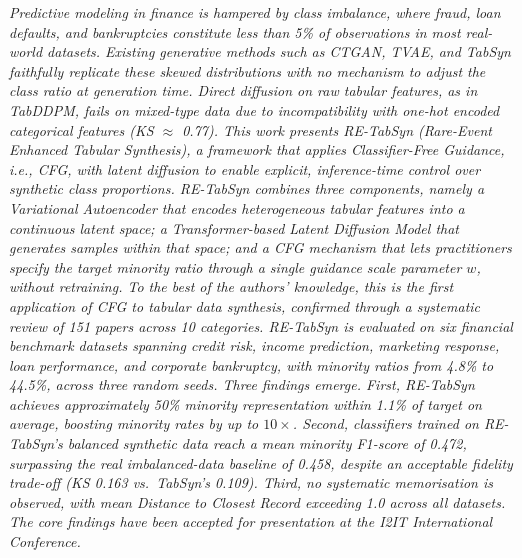 \emph{Predictive modeling in finance is hampered by class imbalance, where fraud, loan defaults, and bankruptcies constitute less than 5\% of observations in most real-world datasets. Existing generative methods such as CTGAN, TVAE, and TabSyn faithfully replicate these skewed distributions with no mechanism to adjust the class ratio at generation time. Direct diffusion on raw tabular features, as in TabDDPM, fails on mixed-type data due to incompatibility with one-hot encoded categorical features (KS $\approx$ 0.77). This work presents RE-TabSyn (Rare-Event Enhanced Tabular Synthesis), a framework that applies Classifier-Free Guidance, i.e., CFG, with latent diffusion to enable explicit, inference-time control over synthetic class proportions. RE-TabSyn combines three components, namely a Variational Autoencoder that encodes heterogeneous tabular features into a continuous latent space; a Transformer-based Latent Diffusion Model that generates samples within that space; and a CFG mechanism that lets practitioners specify the target minority ratio through a single guidance scale parameter $w$, without retraining. To the best of the authors' knowledge, this is the first application of CFG to tabular data synthesis, confirmed through a systematic review of 151 papers across 10 categories. RE-TabSyn is evaluated on six financial benchmark datasets spanning credit risk, income prediction, marketing response, loan performance, and corporate bankruptcy, with minority ratios from 4.8\% to 44.5\%, across three random seeds. Three findings emerge. First, RE-TabSyn achieves approximately 50\% minority representation within 1.1\% of target on average, boosting minority rates by up to $10\times$. Second, classifiers trained on RE-TabSyn's balanced synthetic data reach a mean minority F1-score of 0.472, surpassing the real imbalanced-data baseline of 0.458, despite an acceptable fidelity trade-off (KS 0.163 vs.\ TabSyn's 0.109). Third, no systematic memorisation is observed, with mean Distance to Closest Record exceeding 1.0 across all datasets. The core findings have been accepted for presentation at the I2IT International Conference.}\\
